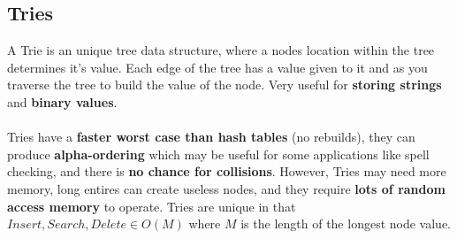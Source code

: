 \documentclass{article}
\begin{document}

\subsection{Tries}
A Trie is an unique tree data structure, where a nodes location within the tree determines it's value. Each edge of the tree has a value given to it and as you traverse the tree to build the value of the node. Very useful for {\bf storing strings} and {\bf binary values}.
\\ \\
Tries have a {\bf faster worst case than hash tables} (no rebuilds), they can produce {\bf alpha-ordering} which may be useful for some applications like spell checking, and there is {\bf no chance for collisions}. However, Tries may need more memory, long entires can create useless nodes, and they require {\bf lots of random access memory} to operate. Tries are unique in that $Insert, Search, Delete \in O(M)$ where $M$ is the length of the longest node value.

\begin{figure}[h]
\centering
{}
\end{figure}


\end{document}
